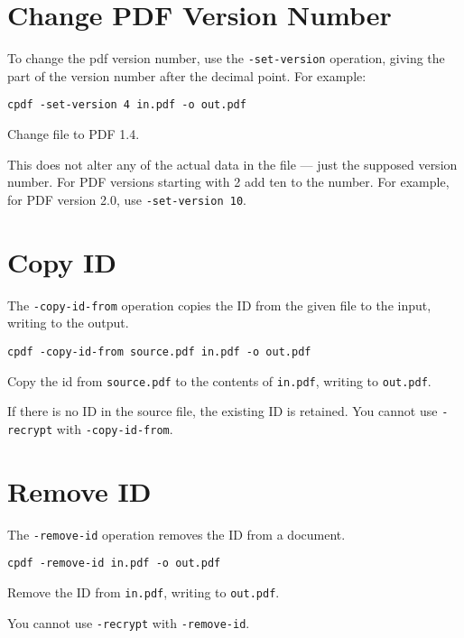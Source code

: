\documentclass{book}
\begin{document}
  \section{Change PDF Version Number}
   \label{setversion}
   To change the pdf version number, use the \texttt{-set-version} operation,
giving the part of the version number after the decimal point. For example:
  \begin{framed}
  \small\noindent\verb!cpdf -set-version 4 in.pdf -o out.pdf!

  \vspace{2.5mm}
  \noindent Change file to PDF 1.4.
  \end{framed} 
  \noindent This does not alter any of the actual data in the file ---
just the supposed version number. For PDF versions starting with 2 add ten to the number. For example, for PDF version 2.0, use \texttt{-set-version 10}.

  \section{Copy ID}
  The \texttt{-copy-id-from} operation copies the ID from the given file to the
input, writing to the output.
  \begin{framed}
  \small\noindent\verb!cpdf -copy-id-from source.pdf in.pdf -o out.pdf!

  \vspace{2.5mm}
  \noindent Copy the id from \texttt{source.pdf} to the contents of \texttt{in.pdf}, writing to \texttt{out.pdf}.
  \end{framed}
  \noindent If there is no ID in the source file, the existing ID is retained. You cannot use \texttt{-recrypt} with \texttt{-copy-id-from}.

\section{Remove ID}
  The \texttt{-remove-id} operation removes the ID from a document.
  \begin{framed}
  \small\noindent\verb!cpdf -remove-id in.pdf -o out.pdf!

  \vspace{2.5mm}
  \noindent Remove the ID from \texttt{in.pdf}, writing to \texttt{out.pdf}.
  \end{framed}

\noindent You cannot use \texttt{-recrypt} with \texttt{-remove-id}.
\end{document}
